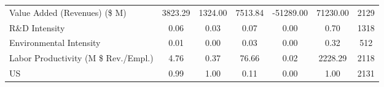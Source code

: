 {\begin{tabular}{l*{1}{cccccc}}
Value Added (Revenues) (\$ M)&     3823.29&     1324.00&     7513.84&   -51289.00&    71230.00&        2129\\
R\&D Intensity      &        0.06&        0.03&        0.07&        0.00&        0.70&        1318\\
Environmental Intensity&        0.01&        0.00&        0.03&        0.00&        0.32&         512\\
Labor Productivity (M \$ Rev./Empl.)&        4.76&        0.37&       76.66&        0.02&     2228.29&        2118\\
US                  &        0.99&        1.00&        0.11&        0.00&        1.00&        2131\\
\hline\hline
\end{tabular}
}
